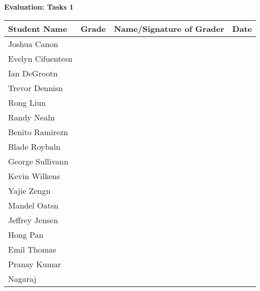 \documentclass[11pt]{article}
\begin{document}
\begin{center}
{\bfseries \LARGE Evaluation: Tasks 1}
\end{center}

\begin{center}
\begin{tabular}{|p{1.75in}|p{0.75in}|p{2.5in}|p{0.75in}|}
\hline
\textbf{Student Name} & \textbf{Grade} & Name/Signature of Grader & Date \\
\hline
Joshua Canon & & & \\ \hline
Evelyn Cifuentesn & & & \\ \hline
Ian DeGrootn & & & \\ \hline
Trevor Dennisn & & & \\ \hline
Rong Liun & & & \\ \hline
Randy Nealn & & & \\ \hline
Benito Ramirezn & & & \\ \hline
Blade Roybaln & & & \\ \hline
George Sullivann & & & \\ \hline
Kevin Wilkens & & & \\ \hline
Yajie Zengn & & & \\ \hline
Mandel Oatsn & & & \\ \hline
Jeffrey Jensen & & & \\ \hline
Hong Pan & & & \\ \hline
Emil Thomas & & & \\ \hline
Pranay Kumar & & & \\ \hline
Nagaraj & & & \\ \hline
\end{tabular}
\end{center}
\end{document}
